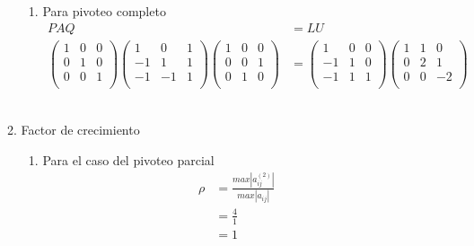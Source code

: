 \begin{enumerate}[]
\begin{enumerate}[]
\begin{enumerate}[]
            \item Para pivoteo completo
            \begin{align*}
                PAQ &= LU\\
                \begin{pmatrix}
                1 & 0 & 0 \\ 
                0 & 1 & 0 \\
                0 & 0 & 1 \\
                \end{pmatrix}
                \begin{pmatrix}
                1 & 0 & 1 \\ 
                -1 & 1 & 1 \\
                -1 & -1 & 1 \\
                \end{pmatrix}
                \begin{pmatrix}
                1 & 0 & 0 \\ 
                0 & 0 & 1 \\
                0 & 1 & 0 \\
                \end{pmatrix} &= 
                \begin{pmatrix}
                1 & 0 & 0 \\ 
                -1 & 1 & 0 \\
                -1 & 1 & 1 \\
                \end{pmatrix}
                \begin{pmatrix}
                1 & 1 & 0 \\ 
                0 & 2 & 1 \\
                0 & 0 & -2 \\
                \end{pmatrix}
            \end{align*}
            \\
        \end{enumerate}
        
        \item Factor de crecimiento
        \begin{enumerate}[]
            \item Para el caso del pivoteo parcial
            \begin{align*}
                \rho &=  \frac{max |a_{ij}^{(2)}|}{max |a_{ij}|}\\
                &=  \frac{4}{1}\\
                &=  1\\
            \end{align*}
            

\end{enumerate}
\end{enumerate}
\end{enumerate}
